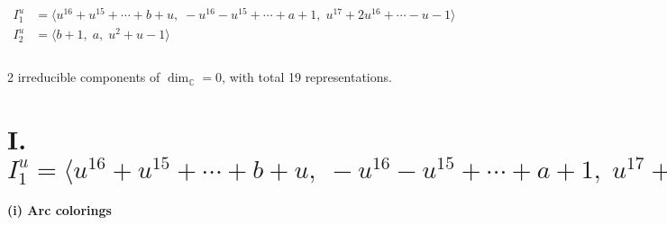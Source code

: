 \documentclass[1p]{elsarticle_modified}
\theoremstyle{definition}
\begin{document}
\begin{align*}
I^u_{1}&=\langle 
u^{16}+u^{15}+\cdots+b+u,\;- u^{16}- u^{15}+\cdots+a+1,\;u^{17}+2 u^{16}+\cdots- u-1\rangle \\
I^u_{2}&=\langle 
b+1,\;a,\;u^2+u-1\rangle \\
\\
\end{align*}
\raggedright * 2 irreducible components of $\dim_{\mathbb{C}}=0$, with total 19 representations.\\
\newpage
\renewcommand{\arraystretch}{1}
\centering \section*{I. $I^u_{1}= \langle u^{16}+u^{15}+\cdots+b+u,\;- u^{16}- u^{15}+\cdots+a+1,\;u^{17}+2 u^{16}+\cdots- u-1 \rangle$}
\flushleft \textbf{(i) Arc colorings}\\
\end{document}
